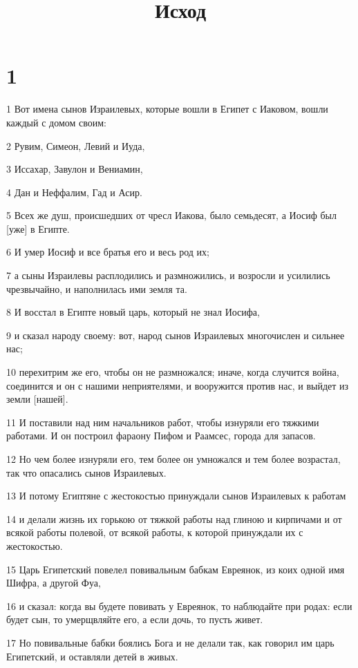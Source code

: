 

\title{Исход}


\chapter{1}

\par 1 Вот имена сынов Израилевых, которые вошли в Египет с Иаковом, вошли каждый с домом своим:
\par 2 Рувим, Симеон, Левий и Иуда,
\par 3 Иссахар, Завулон и Вениамин,
\par 4 Дан и Неффалим, Гад и Асир.
\par 5 Всех же душ, происшедших от чресл Иакова, было семьдесят, а Иосиф был [уже] в Египте.
\par 6 И умер Иосиф и все братья его и весь род их;
\par 7 а сыны Израилевы расплодились и размножились, и возросли и усилились чрезвычайно, и наполнилась ими земля та.
\par 8 И восстал в Египте новый царь, который не знал Иосифа,
\par 9 и сказал народу своему: вот, народ сынов Израилевых многочислен и сильнее нас;
\par 10 перехитрим же его, чтобы он не размножался; иначе, когда случится война, соединится и он с нашими неприятелями, и вооружится против нас, и выйдет из земли [нашей].
\par 11 И поставили над ним начальников работ, чтобы изнуряли его тяжкими работами. И он построил фараону Пифом и Раамсес, города для запасов.
\par 12 Но чем более изнуряли его, тем более он умножался и тем более возрастал, так что опасались сынов Израилевых.
\par 13 И потому Египтяне с жестокостью принуждали сынов Израилевых к работам
\par 14 и делали жизнь их горькою от тяжкой работы над глиною и кирпичами и от всякой работы полевой, от всякой работы, к которой принуждали их с жестокостью.
\par 15 Царь Египетский повелел повивальным бабкам Евреянок, из коих одной имя Шифра, а другой Фуа,
\par 16 и сказал: когда вы будете повивать у Евреянок, то наблюдайте при родах: если будет сын, то умерщвляйте его, а если дочь, то пусть живет.
\par 17 Но повивальные бабки боялись Бога и не делали так, как говорил им царь Египетский, и оставляли детей в живых.
